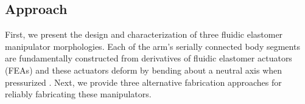 \subsection{Approach}
First, we present the design and characterization of three fluidic elastomer manipulator morphologies.
Each of the arm's serially connected body segments are fundamentally constructed from derivatives of fluidic elastomer actuators (FEAs) \citep{correll2010soft} and these actuators deform by bending about a neutral axis when pressurized \citep{onal2011soft}.
Next, we provide three alternative fabrication approaches for reliably fabricating these manipulators.
%
%
